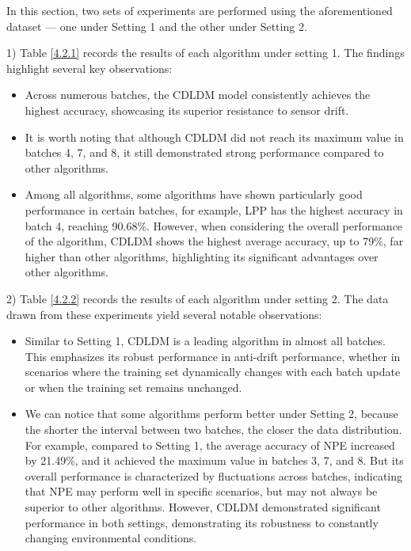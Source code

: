 \documentclass[a4paper]{cas-sc}
\begin{document}
In this section, two sets of experiments are performed using the aforementioned dataset --- one under Setting 1 and the other under Setting 2. 


1) Table \ref{4.2.1} records the results of each algorithm under setting 1. The findings highlight several key observations:

\begin{itemize}
    \item [$\bullet$] 
    Across numerous batches, the CDLDM model consistently achieves the highest accuracy, showcasing its superior resistance to sensor drift.

   \item [$\bullet$] It is worth noting that although CDLDM did not reach its maximum value in batches 4, 7, and 8, it still demonstrated strong performance compared to other algorithms.
   \item [$\bullet$] Among all algorithms, some algorithms have shown particularly good performance in certain batches, for example, LPP has the highest accuracy in batch 4, reaching 90.68\%. However, when considering the overall performance of the algorithm, CDLDM shows the highest average accuracy, up to 79\%, far higher than other algorithms, highlighting its significant advantages over other algorithms.
\end{itemize} 


2) Table \ref{4.2.2} records the results of each algorithm under setting 2. The data drawn from these experiments yield several notable observations:
\begin{itemize}
    \item [$\bullet$]Similar to Setting 1, CDLDM is a leading algorithm in almost all batches. This emphasizes its robust performance in anti-drift performance, whether in scenarios where the training set dynamically changes with each batch update or when the training set remains unchanged.
    \item [$\bullet$] We can notice that some algorithms perform better under Setting 2, because the shorter the interval between two batches, the closer the data distribution. 
    For example, compared to Setting 1, the average accuracy of NPE increased by 21.49\%, and it achieved the maximum value in batches 3, 7, and 8. But its overall performance is characterized by fluctuations across batches, indicating that NPE may perform well in specific scenarios, but may not always be superior to other algorithms. However, CDLDM demonstrated significant performance in both settings, demonstrating its robustness to constantly changing environmental conditions.
\end{itemize} 
\end{document}
